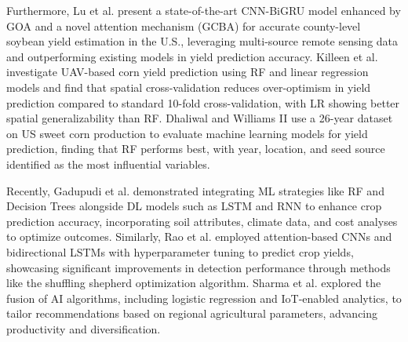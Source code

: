 Furthermore, Lu et al. \cite{lu2024goa} present a state-of-the-art CNN-BiGRU model enhanced by GOA and a novel attention mechanism (GCBA) for accurate county-level soybean yield estimation in the U.S., leveraging multi-source remote sensing data and outperforming existing models in yield prediction accuracy. Killeen et al. \cite{killeen2024corn} investigate UAV-based corn yield prediction using RF and linear regression models and find that spatial cross-validation reduces over-optimism in yield prediction compared to standard 10-fold cross-validation, with LR showing better spatial generalizability than RF. Dhaliwal and Williams II \cite{dhaliwal2024sweet} use a 26-year dataset on US sweet corn production to evaluate machine learning models for yield prediction, finding that RF performs best, with year, location, and seed source identified as the most influential variables.

Recently, Gadupudi et al. \cite{gadupudi2024adaptive} demonstrated integrating ML strategies like RF and Decision Trees alongside DL models such as LSTM and RNN to enhance crop prediction accuracy, incorporating soil attributes, climate data, and cost analyses to optimize outcomes. Similarly, Rao et al. \cite{rao2024brinjal} employed attention-based CNNs and bidirectional LSTMs with hyperparameter tuning to predict crop yields, showcasing significant improvements in detection performance through methods like the shuffling shepherd optimization algorithm. Sharma et al. \cite{sharma2025enhancing} explored the fusion of AI algorithms, including logistic regression and IoT-enabled analytics, to tailor recommendations based on regional agricultural parameters, advancing productivity and diversification. 

